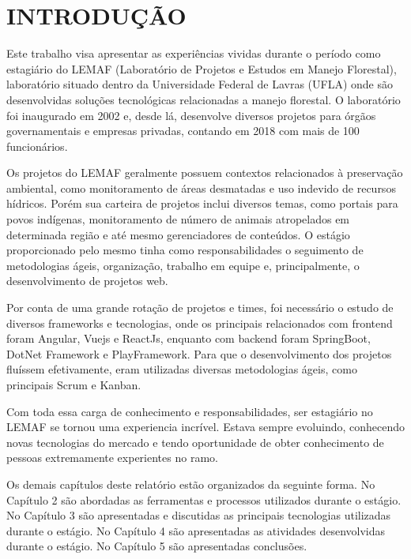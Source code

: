 \chapter{INTRODUÇÃO}
\label{cap:introducao}

Este trabalho visa apresentar as experiências vividas durante o período como estagiário do LEMAF (Laboratório de Projetos e Estudos
em Manejo Florestal), laboratório situado dentro da Universidade Federal de Lavras (UFLA) onde são desenvolvidas soluções tecnológicas relacionadas a manejo florestal.
O laboratório foi inaugurado em 2002 e, desde lá, desenvolve diversos projetos para órgãos governamentais e empresas privadas, contando em 2018 com mais de 100 funcionários.

Os projetos do LEMAF geralmente possuem contextos relacionados à preservação ambiental, como monitoramento de áreas desmatadas e uso indevido de recursos hídricos. Porém sua carteira de projetos inclui diversos temas, como portais para povos indígenas, monitoramento de número de animais atropelados em determinada região e até mesmo gerenciadores de conteúdos.   
O estágio proporcionado pelo mesmo tinha como responsabilidades o seguimento de metodologias ágeis, organização, trabalho em equipe e, principalmente, o desenvolvimento de projetos web.

Por conta de uma grande rotação de projetos e times, foi necessário o estudo de diversos frameworks e tecnologias, onde os principais relacionados com frontend foram Angular, Vuejs e ReactJs, enquanto com backend foram SpringBoot, DotNet Framework e PlayFramework.
Para que o desenvolvimento dos projetos fluíssem efetivamente, eram utilizadas diversas metodologias ágeis, como principais Scrum e Kanban.

Com toda essa carga de conhecimento e responsabilidades, ser estagiário no LEMAF se tornou uma experiencia incrível. Estava sempre evoluindo, conhecendo novas tecnologias do mercado e tendo oportunidade de obter conhecimento de pessoas extremamente experientes no ramo.

Os demais capítulos deste relatório estão organizados da seguinte forma.  No Capítulo 2 são abordadas as ferramentas e processos utilizados durante o estágio. No Capítulo 3 são apresentadas e discutidas as principais tecnologias utilizadas durante o estágio. No Capítulo 4 são apresentadas as atividades desenvolvidas durante o estágio. No Capítulo 5 são apresentadas conclusões.